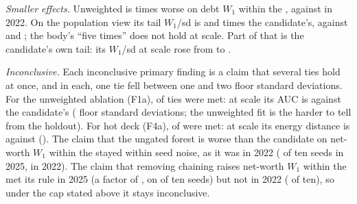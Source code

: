 \emph{Smaller effects.} Unweighted is 
times worse on debt $W_1$ within the \scf{}, against
 in 2022. On the population view its tail
$W_1$/sd is  and
 times the candidate's, against
 and ;
the body's ``five times'' does not hold at scale. Part of that is the
candidate's own tail: its $W_1$/sd at scale rose from
 to .

\emph{Inconclusive.} Each inconclusive primary finding is a claim that
several ties hold at once, and in each, one tie fell between one and two
floor standard deviations. For the unweighted ablation (F1a),  of
 ties were met: at scale its AUC is
 against the candidate's
 ( floor
standard deviations; the unweighted fit is the harder to tell from the
holdout). For hot deck (F4a),  of 
were met: at scale its energy distance is 
against 
(). The claim that the ungated forest is
worse than the candidate on net-worth $W_1$ within the \scf{} stayed within
seed noise, as it was in 2022 ( of ten seeds in
2025,  in 2022). The claim that removing
chaining raises net-worth $W_1$ within the \scf{} met its rule in 2025 (a
factor of , on
 of ten seeds) but not in 2022
( of ten), so under the cap stated above it
stays inconclusive.

